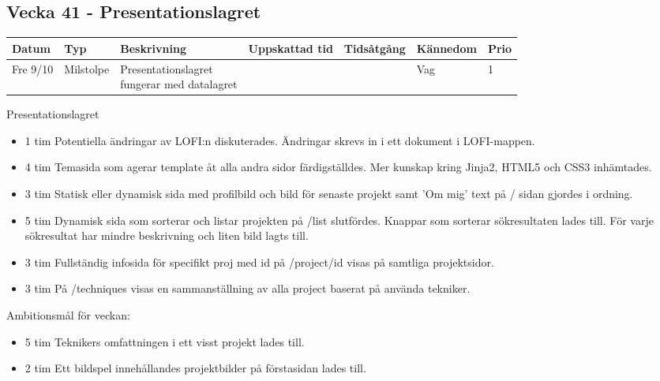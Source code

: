 \documentclass{TDP003mall}
\begin{document}
  \subsection*{Vecka 41 - Presentationslagret}
  \begin{tabularx}{\linewidth}{|l|l|X|l|l|l|l|}
  \hline
  Datum          & Typ       & Beskrivning                                                  & Uppskattad tid & Tidsåtgång & Kännedom & Prio \\ [0.5ex]
  \hline                                             
        Fre 9/10 & Milstolpe & \makecell[tl]{Presentationslagret \\fungerar med datalagret} &                &            & Vag      & 1 \\
  \hline                                             
\end{tabularx}
Presentationslagret
\begin{itemize}
  \item 1 tim Potentiella ändringar av LOFI:n diskuterades. Ändringar skrevs in i ett dokument i LOFI-mappen.
  \item 4 tim Temasida som agerar template åt alla andra sidor färdigställdes. Mer kunskap kring Jinja2, HTML5 och CSS3 inhämtades.
  \item 3 tim Statisk eller dynamisk sida med profilbild och bild för senaste projekt samt 'Om mig' text på / sidan gjordes i ordning.
  \item 5 tim Dynamisk sida som sorterar och listar projekten på /list slutfördes. Knappar som sorterar sökresultaten lades till. För varje sökresultat har mindre beskrivning och liten bild lagts till.                  
  \item 3 tim Fullständig infosida för specifikt proj med id på /project/id visas på samtliga projektsidor.
  \item 3 tim På /techniques visas en sammanställning av alla project baserat på använda tekniker.
\end{itemize}

Ambitionsmål för veckan:
\begin{itemize}
\item 5 tim Teknikers omfattningen i ett visst projekt lades till.
\item 2 tim Ett bildspel innehållandes projektbilder på förstasidan lades till.
\end{itemize}
\end{document}

